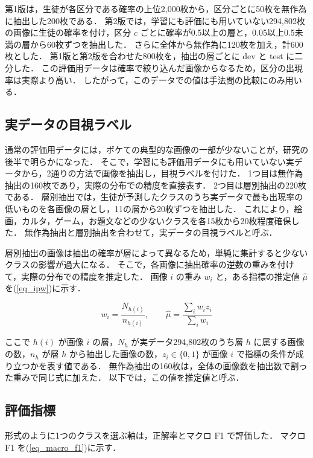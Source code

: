 第1版は，生徒が各区分である確率の上位2,000枚から，区分ごとに50枚を無作為に抽出した200枚である．
第2版では，学習にも評価にも用いていない294,802枚の画像に生徒の確率を付け，区分 $ c $ ごとに確率が0.5以上の層と，0.05以上0.5未満の層から60枚ずつを抽出した．
さらに全体から無作為に120枚を加え，計600枚とした．
第1版と第2版を合わせた800枚を，抽出の層ごとに dev と test に二分した．
この評価用データは確率で絞り込んだ画像からなるため，区分の出現率は実際より高い．
したがって，このデータでの値は手法間の比較にのみ用いる．

\subsection{実データの目視ラベル}
通常の評価用データには，ボケての典型的な画像の一部が少ないことが，研究の後半で明らかになった．
そこで，学習にも評価用データにも用いていない実データから，2通りの方法で画像を抽出し，目視ラベルを付けた．
1つ目は無作為抽出の160枚であり，実際の分布での精度を直接表す．
2つ目は層別抽出の220枚である．
層別抽出では，生徒が予測したクラスのうち実データで最も出現率の低いものを各画像の層とし，11の層から20枚ずつを抽出した．
これにより，絵画，カルタ，ゲーム，お題文などの少ないクラスを各15枚から20枚程度確保した．
無作為抽出と層別抽出を合わせて，実データの目視ラベルと呼ぶ．

層別抽出の画像は抽出の確率が層によって異なるため，単純に集計すると少ないクラスの影響が過大になる．
そこで，各画像に抽出確率の逆数の重みを付けて，実際の分布での精度を推定した．
画像 $ i $ の重み $ w_i $ と，ある指標の推定値 $ \hat{\mu} $ を(\ref{eq_ipw})に示す．

\begin{equation}
    w_i = \frac{N_{h(i)}}{n_{h(i)}},
    \qquad
    \hat{\mu} = \frac{\sum_{i} w_i z_i}{\sum_{i} w_i}
    \label{eq_ipw}
\end{equation}

\noindent
ここで $ h(i) $ が画像 $ i $ の層，$ N_h $ が実データ294,802枚のうち層 $ h $ に属する画像の数，$ n_h $ が層 $ h $ から抽出した画像の数，$ z_i \in \{0, 1\} $ が画像 $ i $ で指標の条件が成り立つかを表す値である．
無作為抽出の160枚は，全体の画像数を抽出数で割った重みで同じ式に加えた．
以下では，この値を推定値と呼ぶ．

\subsection{評価指標}
形式のように1つのクラスを選ぶ軸は，正解率とマクロ F1 で評価した．
マクロ F1 を(\ref{eq_macro_f1})に示す．

